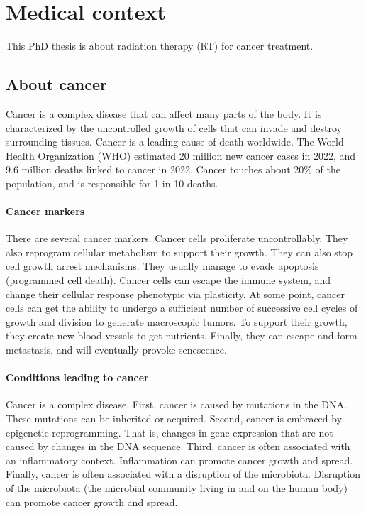\section{Medical context}

This PhD thesis is about radiation therapy (RT) for cancer treatment.

\subsection{About cancer}

Cancer is a complex disease that can affect many parts of the body.
It is characterized by the uncontrolled growth of cells that can invade and destroy surrounding tissues.
Cancer is a leading cause of death worldwide.
The World Health Organization (WHO) estimated 20 million new cancer cases in 2022, and 9.6 million deaths linked to cancer in 2022\cite{who_cancer2022}.
Cancer touches about 20\% of the population, and is responsible for 1 in 10 deaths.

\paragraph{Cancer markers}
There are several cancer markers.
Cancer cells proliferate uncontrollably.
They also reprogram cellular metabolism to support their growth\cite{Chammas2013}.
They can also stop cell growth arrest mechanisms.
They usually manage to evade apoptosis (programmed cell death).
Cancer cells can escape the immune system, and change their cellular response phenotypic via plasticity.
At some point, cancer cells can get the ability to undergo a sufficient number of successive cell cycles of growth and division to generate macroscopic tumors.
To support their growth, they create new blood vessels to get nutrients.
Finally, they can escape and form metastasis, and will eventually provoke senescence.

\paragraph{Conditions leading to cancer}
Cancer is a complex disease.
First, cancer is caused by mutations in the DNA.
These mutations can be inherited or acquired.
Second, cancer is embraced by epigenetic reprogramming.
That is, changes in gene expression that are not caused by changes in the DNA sequence.
Third, cancer is often associated with an inflammatory context.
Inflammation can promote cancer growth and spread.
Finally, cancer is often associated with a disruption of the microbiota.
Disruption of the microbiota (the microbial community living in and on the human body) can promote cancer growth and spread.

